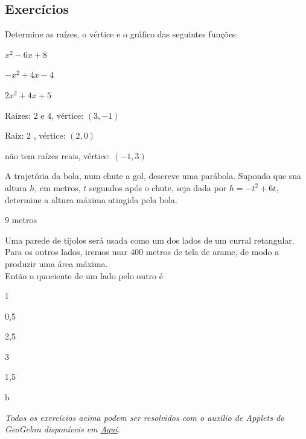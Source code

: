 \documentclass[../main.tex]{subfiles}
\begin{document}
\subsection{Exercícios}
\begin{exer}
  Determine as raízes, o vértice e o gráfico das seguintes funções:
  \begin{multicols}{3}
  \begin{compactenum}[a)]
  \item $x^2-6x+8$ \item $-x^2+4x-4$\item $2x^2+4x+5$
  \end{compactenum}
 \end{multicols}
\end{exer}
\begin{resp}
\begin{multicols}{2}
  \begin{compactenum}[a)]
  \item Raízes: 2 e 4, vértice: $(3,-1)$ \item Raiz: 2 , vértice: $(2,0)$\item não tem raízes reais, vértice: $(-1,3)$
  \end{compactenum}
 \end{multicols}
\end{resp}
\begin{exer}
  A trajetória da bola, num chute a gol, descreve uma parábola. Supondo que sua altura $h$, em metros, $t$ segundos após o chute, seja dada por  $h = -t^2 + 6 t$, determine a altura máxima atingida pela bola.
\end{exer}
\begin{resp}
$9$ metros
\end{resp}
\begin{exer}
   Uma parede de tijolos será usada como um dos lados de um curral retangular. Para os outros lados, iremos usar 400 metros de tela de arame, de modo a produzir uma área máxima.\\
Então o quociente de um lado pelo outro é
\begin{multicols}{5}
\begin{compactenum}[a)]
\item  1\item  0,5\item  2,5\item  3\item 1,5
\end{compactenum}
\end{multicols}
\end{exer}
\begin{resp}
  b
\end{resp}
\begin{obs}
 \textit{ Todos os exercícios acima podem ser resolvidos com o auxílio de Applets do GeoGebra disponíveis em \href{https://www.geogebra.org/m/pnscwa4e}{Aqui}.}
\end{obs}
\end{document}
